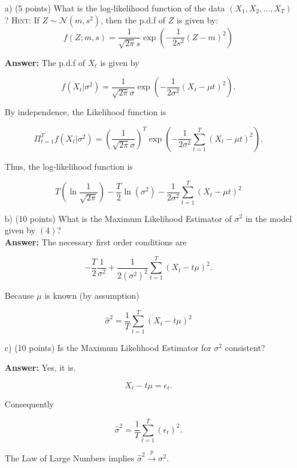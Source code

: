 \documentclass[12] {article}
\begin{document}
\begin{itemize}
\item [a)] (5 points) What is the log-likelihood function of the data $(X_1, X_2, \ldots, X_{T})$? {\scshape Hint:} If $Z \sim \mathcal{N}(m, s^2)$, then the p.d.f of $Z$ is given by:
$$ f(Z; m, s) = \frac{1}{\sqrt{2\pi} s } \exp \left( -\frac{1}{2 s^2} (Z-m)^2 \right)  $$

\textbf{Answer:} The p.d.f of $X_t$ is given by

\[ f(X_t |  \sigma^2) =  \frac{1}{\sqrt{2\pi} \sigma } \exp \left( -\frac{1}{2 \sigma^2} (X_t-\mu t)^2 \right).   \]

By independence, the Likelihood function is

\[ \Pi_{t=1}^{T} f(X_t |  \sigma^2) =  \left( \frac{1}{\sqrt{2\pi} \sigma } \right)^{T} \exp \left( -\frac{1}{2 \sigma^2} \sum_{t=1}^{T}(X_t-\mu t)^2 \right).   \]

Thus, the log-likelihood function is

\[ T \left( \ln \frac{1}{\sqrt{2 \pi}} \right) - \frac{T}{2} \ln (\sigma^2) -  \frac{1}{2 \sigma^2} \sum_{t=1}^{T}(X_t-\mu t)^2 \]


 
 \item [b)] (10 points) What is the Maximum Likelihood Estimator of $\sigma^2$ in the model given by $(4)$? \\
 
\textbf{Answer:} The necessary first order conditions are

\[ -\frac{T}{2} \frac{1}{\sigma^2} + \frac{1}{2 (\sigma^2)^2} \sum_{t=1}^{T} (X_t - t \mu)^2 . \]

Because $\mu$ is known (by assumption) 

\[ \widehat{\sigma}^2 = \frac{1}{T} \sum_{t=1}^{T} (X_t - t \mu)^2 \] 
 
 
 \item [c)] (10 points) Is the Maximum Likelihood Estimator for $\sigma^2$ consistent? 
  
\textbf{Answer:} Yes, it is. 

\[ X_t - t \mu = \epsilon_t. \]

Consequently  

\[ \widehat{\sigma}^2 = \frac{1}{T} \sum_{t=1}^{T} (\epsilon_t)^2. \]

The Law of Large Numbers implies $\widehat{\sigma}^2 \overset{p}{\rightarrow} \sigma^2$.  
  
\end{itemize}



 
\end{document}
